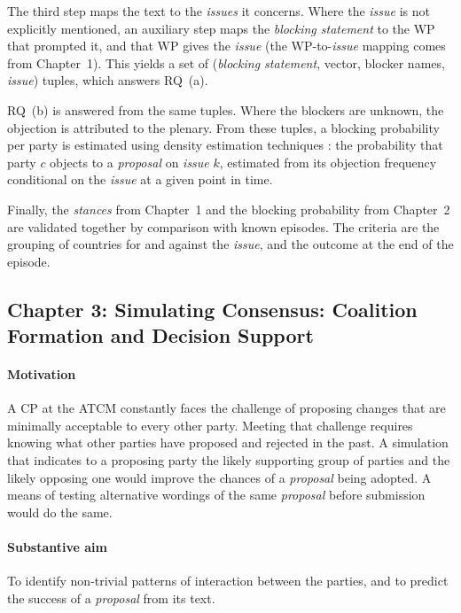 The third step maps the text to the \textit{issues} it concerns. Where the \textit{issue} is not
explicitly mentioned, an auxiliary step maps the \textit{blocking statement} to the WP that
prompted it, and that WP gives the \textit{issue} (the WP-to-\textit{issue} mapping comes from
Chapter~1). This yields a set of (\textit{blocking statement}, vector, blocker names,
\textit{issue}) tuples, which answers RQ~(a).

RQ~(b) is answered from the same tuples. Where the blockers are unknown, the objection is
attributed to the plenary. From these tuples, a blocking probability per party is estimated using
density estimation techniques \parencite{Parzen1962}: the probability that party $c$ objects to a
\textit{proposal} on
\textit{issue} $k$, estimated from its objection frequency conditional on the \textit{issue} at a
given point in time.

Finally, the \textit{stances} from Chapter~1 and the blocking probability from Chapter~2 are
validated together by comparison with known episodes. The criteria are the grouping of countries
for and against the \textit{issue}, and the outcome at the end of the episode.


\subsection{Chapter 3: Simulating Consensus: Coalition Formation and Decision Support}
\label{sec:ch3}

\paragraph{Motivation}
A CP at the ATCM constantly faces the challenge of proposing changes that are minimally
acceptable to every other party. Meeting that challenge requires knowing what other parties have
proposed and rejected in the past. A simulation that indicates to a proposing party the likely
supporting group of parties and the likely opposing one would improve the chances of a
\textit{proposal} being adopted. A means of testing alternative wordings of the same
\textit{proposal} before submission would do the same.

\paragraph{Substantive aim}
To identify non-trivial patterns of interaction between the parties, and to predict the success
of a \textit{proposal} from its text.

